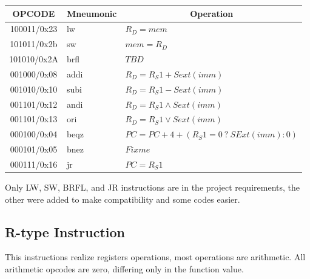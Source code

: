 \documentclass{article}
\begin{document}
  \FloatBarrier
  \begin{table}[H]
    \begin{center}
      \begin{tabular}[pos]{| c | l | l |} \hline 	
      \multicolumn{1}{|c|}{\cellcolor[gray]{0.9}\textbf{OPCODE}} & 
      \multicolumn{1}{c|}{\cellcolor[gray]{0.9}\textbf{Mneumonic}} & 
      \multicolumn{1}{c|}{\cellcolor[gray]{0.9}\textbf{Operation}} \\ \hline
	 100011/0x23 	& lw & $R_D = mem$ \\ \hline
	 101011/0x2b 	& sw & $mem = R_D$ \\ \hline
	 101010/0x2A 	& brfl & $TBD$ \\ \hline
	 001000/0x08 & addi & $R_D = R_S1 + Sext(imm)$ \\ \hline
	 001010/0x10 & subi & $R_D = R_S1 - Sext(imm)$ \\ \hline
	 001101/0x12 & andi & $R_D = R_S1 \land Sext(imm)$ \\ \hline
	 001101/0x13 & ori & $R_D = R_S1 \lor Sext(imm)$ \\ \hline
	 000100/0x04 & beqz & $PC = PC + 4 +(R_S1 = 0~?~SExt(imm): 0)$ \\ \hline
	 000101/0x05 & bnez & $Fixme$ \\ \hline
	 000111/0x16 & jr & $PC = R_S1$ \\ \hline
      \end{tabular}
    \end{center}
  \end{table} 

Only LW, SW, BRFL, and JR instructions are in the project requirements, the other were added to make compatibility and some codes easier.
  
  \subsection{R-type Instruction}
This instructions realize registers operations, most operations are arithmetic. All arithmetic opcodes are zero, differing only in the function value.
\end{document}
